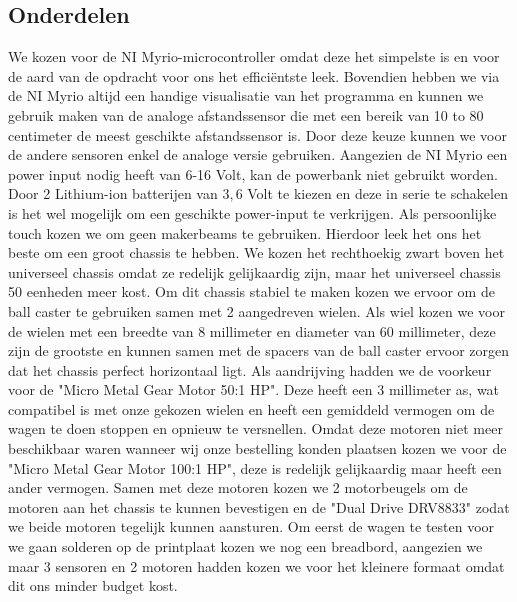 \documentclass[a4paper,twoside,kulak]{kulakreport}
\begin{document}
	\subsection{Onderdelen}
		We kozen voor de NI Myrio-microcontroller omdat deze het simpelste is en voor de aard van de opdracht voor ons het efficiëntste leek. Bovendien hebben we via de NI Myrio altijd een handige visualisatie van het programma en kunnen we gebruik maken van de analoge afstandssensor die met een bereik van 10 to 80 centimeter de meest geschikte afstandssensor is.
	Door deze keuze kunnen we voor de andere sensoren enkel de analoge versie gebruiken. Aangezien de NI Myrio een power input nodig heeft van 6-16 Volt, kan de powerbank niet gebruikt worden. Door 2 Lithium-ion batterijen van $3,6$ Volt te kiezen en deze in serie te schakelen is het wel mogelijk om een geschikte power-input te verkrijgen.
	Als persoonlijke touch kozen we om geen makerbeams te gebruiken. Hierdoor leek het ons het beste om een groot chassis te hebben. We kozen het rechthoekig zwart boven het universeel chassis omdat ze redelijk gelijkaardig zijn, maar het universeel chassis 50 eenheden meer kost. Om dit chassis stabiel te maken kozen we ervoor om de ball caster te gebruiken samen met 2 aangedreven wielen. Als wiel kozen we voor de wielen met een breedte van 8 millimeter en diameter van 60 millimeter, deze zijn de grootste en kunnen samen met de spacers van de ball caster ervoor zorgen dat het chassis perfect horizontaal ligt. Als aandrijving hadden we de voorkeur voor de "Micro Metal Gear Motor 50:1 HP". Deze heeft een 3 millimeter as, wat compatibel is met onze gekozen wielen en heeft een gemiddeld vermogen om de wagen te doen stoppen en opnieuw te versnellen. Omdat deze motoren niet meer beschikbaar waren wanneer wij onze bestelling konden plaatsen kozen we voor de "Micro Metal Gear Motor 100:1 HP", deze is redelijk gelijkaardig maar heeft een ander vermogen. Samen met deze motoren kozen we 2 motorbeugels om de motoren aan het chassis te kunnen bevestigen en de "Dual Drive DRV8833" zodat we beide motoren tegelijk kunnen aansturen.
	Om eerst de wagen te testen voor we gaan solderen op de printplaat kozen we nog een breadbord, aangezien we maar 3 sensoren en 2 motoren hadden kozen we voor het kleinere formaat omdat dit ons minder budget kost. 
\end{document}
